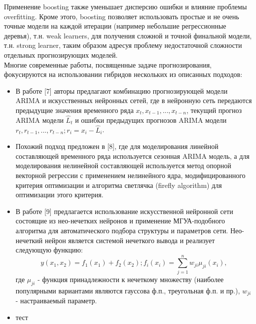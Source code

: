 \documentclass[11pt]{article}
\begin{document}
Применение boosting также уменьшает дисперсию ошибки и влияние проблемы overfitting. Кроме этого, boosting позволяет использовать простые и не очень точные модели на каждой итерации (например небольшие регрессионные деревья), т.н. weak learners, для получения сложной и точной финальной модели, т.н. strong learner, таким образом адресуя проблему недостаточной сложности отдельных прогнозирующих моделей.
\\
Многие современные работы, посвященные задаче прогнозирования, фокусируются на использовании гибридов нескольких из описанных подходов:
\begin{itemize}
\item В работе [7] авторы предлагают комбинацию прогнозирующей модели ARIMA и искусственных нейронных сетей, где в нейронную сеть передаются предыдущие значения временного ряда $x_t,x_{t-1},...,x_{t-n}$, текущий прогноз ARIMA модели $\hat{L}_t$ и ошибки предыдущих прогнозов ARIMA модели $r_t,r_{t-1},...,r_{t-n};r_i=x_i-\hat{L}_i$.
\item Похожий подход предложен в [8], где для моделирования линейной составляющей временного ряда используется сезонная ARIMA модель, а для моделирования нелинейной составляющей используется метод опорной векторной регрессии с применением нелинейного ядра, модифицированного критерия оптимизации и алгоритма светлячка (firefly algorithm) для оптимизации этого критерия.
\item В работе [9] предлагается использование искусственной нейронной сети состоящие из нео-нечетких нейронов и применение МГУА-подобного алгоритма для автоматического подбора структуры и параметров сети. Нео-нечеткий нейрон является системой нечеткого вывода и реализует следующую функцию:
$$ y(x_1,x_2) = f_1(x_1) + f_2(x_2); f_i(x_i) = \sum_{j=1}^{n}{w_{ji}\mu_{ji}(x_i)},  $$
где $\mu_{ji}$ - функция принадлежности к нечеткому множеству (наиболее популярными вариантами являются гауссова ф.п., треугольная ф.п. и пр.), $w_{ji}$ - настраиваемый параметр.
\item тест
\end{itemize}
\end{document}
